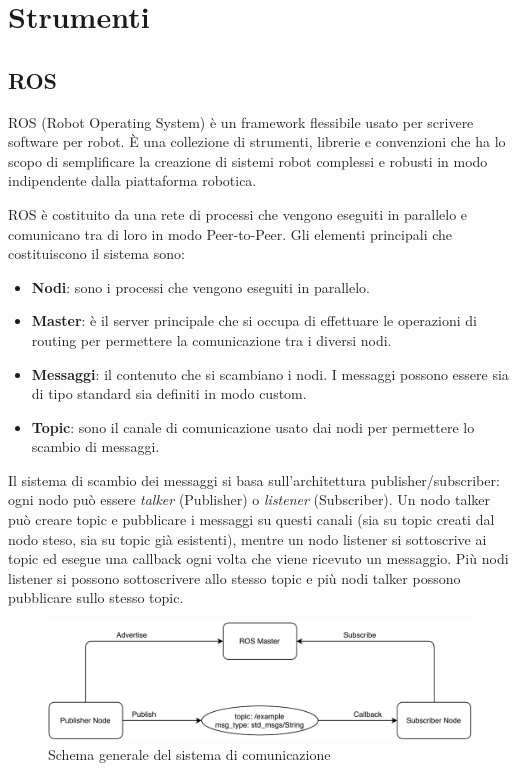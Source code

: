 \chapter{Strumenti}

\section{ROS}

ROS (Robot Operating System) è un framework flessibile usato per scrivere software per robot.
È una collezione di strumenti, librerie e convenzioni che ha lo scopo di semplificare la creazione di sistemi robot complessi e robusti in modo indipendente dalla piattaforma robotica.

ROS è costituito da una rete di processi che vengono eseguiti in parallelo e comunicano tra di loro in modo Peer-to-Peer.
Gli elementi principali che costituiscono il sistema sono:
\begin{itemize}
  \item \textbf{Nodi}: sono i processi che vengono eseguiti in parallelo.
  \item \textbf{Master}: è il server principale che si occupa di effettuare le operazioni di routing per permettere la comunicazione tra i diversi nodi.
  \item \textbf{Messaggi}: il contenuto che si scambiano i nodi. I messaggi possono essere sia di tipo standard sia definiti in modo custom.
  \item \textbf{Topic}: sono il canale di comunicazione usato dai nodi per permettere lo scambio di messaggi.
\end{itemize}
Il sistema di scambio dei messaggi si basa sull'architettura publisher/subscriber: ogni nodo può essere \textit{talker} (Publisher) o \textit{listener}  (Subscriber).
Un nodo talker può creare topic e pubblicare i messaggi su questi canali (sia su topic creati dal nodo steso, sia su topic già esistenti), mentre un nodo listener si sottoscrive ai topic ed esegue una callback ogni volta che viene ricevuto un messaggio. Più nodi listener si possono sottoscrivere allo stesso topic e più nodi talker possono pubblicare sullo stesso topic.

\begin{figure}[H]
\centering
\includegraphics[scale=0.9]{images/ros_system.pdf}
\caption{Schema generale del sistema di comunicazione}
\end{figure}

